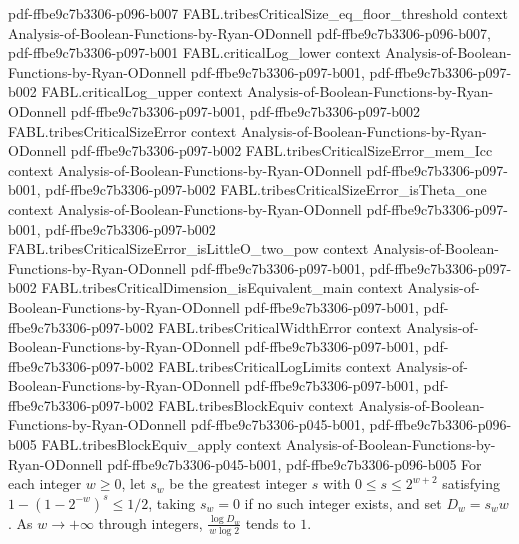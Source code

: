 \begin{theorem}
{    pdf-ffbe9c7b3306-p096-b007}
\proofstep
  {FABL.tribesCriticalSize_eq_floor_threshold}
  {context}
  {Analysis-of-Boolean-Functions-by-Ryan-ODonnell}
  {pdf-ffbe9c7b3306-p096-b007,
    pdf-ffbe9c7b3306-p097-b001}
\proofstep
  {FABL.criticalLog_lower}
  {context}
  {Analysis-of-Boolean-Functions-by-Ryan-ODonnell}
  {pdf-ffbe9c7b3306-p097-b001,
    pdf-ffbe9c7b3306-p097-b002}
\proofstep
  {FABL.criticalLog_upper}
  {context}
  {Analysis-of-Boolean-Functions-by-Ryan-ODonnell}
  {pdf-ffbe9c7b3306-p097-b001,
    pdf-ffbe9c7b3306-p097-b002}
\proofstep
  {FABL.tribesCriticalSizeError}
  {context}
  {Analysis-of-Boolean-Functions-by-Ryan-ODonnell}
  {pdf-ffbe9c7b3306-p097-b002}
\proofstep
  {FABL.tribesCriticalSizeError_mem_Icc}
  {context}
  {Analysis-of-Boolean-Functions-by-Ryan-ODonnell}
  {pdf-ffbe9c7b3306-p097-b001,
    pdf-ffbe9c7b3306-p097-b002}
\proofstep
  {FABL.tribesCriticalSizeError_isTheta_one}
  {context}
  {Analysis-of-Boolean-Functions-by-Ryan-ODonnell}
  {pdf-ffbe9c7b3306-p097-b001,
    pdf-ffbe9c7b3306-p097-b002}
\proofstep
  {FABL.tribesCriticalSizeError_isLittleO_two_pow}
  {context}
  {Analysis-of-Boolean-Functions-by-Ryan-ODonnell}
  {pdf-ffbe9c7b3306-p097-b001,
    pdf-ffbe9c7b3306-p097-b002}
\proofstep
  {FABL.tribesCriticalDimension_isEquivalent_main}
  {context}
  {Analysis-of-Boolean-Functions-by-Ryan-ODonnell}
  {pdf-ffbe9c7b3306-p097-b001,
    pdf-ffbe9c7b3306-p097-b002}
\proofstep
  {FABL.tribesCriticalWidthError}
  {context}
  {Analysis-of-Boolean-Functions-by-Ryan-ODonnell}
  {pdf-ffbe9c7b3306-p097-b001,
    pdf-ffbe9c7b3306-p097-b002}
\proofstep
  {FABL.tribesCriticalLogLimits}
  {context}
  {Analysis-of-Boolean-Functions-by-Ryan-ODonnell}
  {pdf-ffbe9c7b3306-p097-b001,
    pdf-ffbe9c7b3306-p097-b002}
\proofstep
  {FABL.tribesBlockEquiv}
  {context}
  {Analysis-of-Boolean-Functions-by-Ryan-ODonnell}
  {pdf-ffbe9c7b3306-p045-b001,
    pdf-ffbe9c7b3306-p096-b005}
\proofstep
  {FABL.tribesBlockEquiv_apply}
  {context}
  {Analysis-of-Boolean-Functions-by-Ryan-ODonnell}
  {pdf-ffbe9c7b3306-p045-b001,
    pdf-ffbe9c7b3306-p096-b005}
For each integer $w\geq0$, let $s_w$ be the greatest integer $s$ with $0\leq s\leq
2^{w+2}$ satisfying $1-(1-2^{-w})^s\leq 1/2$, taking $s_w=0$ if no such integer exists,
and set $D_w=s_w w$. As $w\to+\infty$ through integers, $\frac{\log D_w}{w\log 2}$ tends
to $1$.
\end{theorem}

